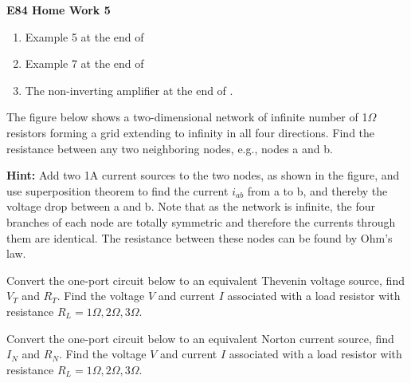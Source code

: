 \usepackage{html}

\begin{center}
{\Large \bf E84 Home Work 5}
\end{center}
\begin{enumerate}

\item Example 5 at the end of 

\item Example 7 at the end of 

\item The non-inverting amplifier at the end of .

\end{enumerate}



\item The figure below shows a two-dimensional network of infinite number 
of 1$\Omega$ resistors forming a grid extending to infinity in all four 
directions. Find the resistance between any two neighboring nodes, e.g., 
nodes a and b.


{\bf Hint:} Add two 1A current sources to the two nodes, as shown in the 
figure, and use superposition theorem to find the current $i_{ab}$ from 
a to b, and thereby the voltage drop between a and b. Note that as the
network is infinite, the four branches of each node are totally symmetric
and therefore the currents through them are identical. The resistance 
between these nodes can be found by Ohm's law.

\item Convert the one-port circuit below to an equivalent Thevenin voltage
source, find $V_T$ and $R_T$. Find the voltage $V$ and current $I$ associated
with a load resistor with resistance $R_L=1\Omega, 2\Omega, 3\Omega$.


\item Convert the one-port circuit below to an equivalent Norton current
source, find $I_N$ and $R_N$. Find the voltage $V$ and current $I$ associated
with a load resistor with resistance $R_L=1\Omega, 2\Omega, 3\Omega$.

